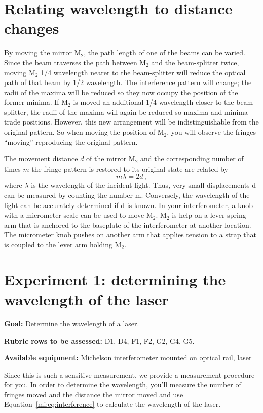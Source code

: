 \section{Relating wavelength to distance changes}

By moving the mirror M$_2$, the path length of one of the beams can be varied. Since the beam traverses the path
between M$_2$ and the beam-splitter twice, moving M$_2$ 1/4 wavelength nearer to the beam-splitter will reduce the optical
path of that beam by 1/2 wavelength. The interference pattern will change; the radii of the maxima will be reduced so
they now occupy the position of the former minima. If M$_2$ is moved an additional 1/4 wavelength closer to the beam-splitter, the radii of the maxima will again be reduced so maxima and minima trade positions. However, this new
arrangement will be indistinguishable from the original pattern. So when moving the position of M$_2$, you will observe the
fringes ``moving'' reproducing the original pattern.

The movement distance $d$ of the mirror M$_2$ and the corresponding number of times $m$ the fringe pattern is restored to its original state are related by
\begin{equation}\label{mi:eq:interference}
 m \lambda = 2 d \, ,
\end{equation}
where $\lambda$ is the wavelength of the incident light. Thus, very small displacements d can be measured by counting the number m. Conversely, the wavelength of the light
can be accurately determined if d is known. In your interferometer, a knob with a micrometer scale can be used to move
M$_2$. M$_2$ is help on a lever spring arm that is anchored to the baseplate of the interferometer at another location. The
micrometer knob pushes on another arm that applies tension to a strap that is coupled to the lever arm holding M$_2$.

\section{Experiment 1: determining the wavelength of the laser}

\textbf{Goal:} Determine the wavelength of a laser.

\textbf{Rubric rows to be assessed:} D1, D4, F1, F2, G2, G4, G5.

\textbf{Available equipment:} Michelson interferometer mounted on optical rail, laser

Since this is such a sensitive measurement, we provide a measurement procedure for you. In order to determine the wavelength, you'll measure the number of fringes moved and the distance the mirror moved  and use Equation~\ref{mi:eq:interference} to calculate the wavelength of the laser.

